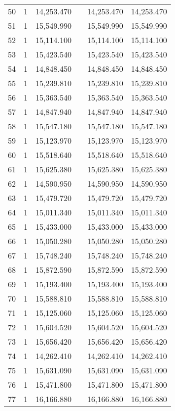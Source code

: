 \begin{table}[!htbp]
\begin{tabular}{@{\extracolsep{5pt}}lccccc}
50 & 1 & 14,253.470 &  & 14,253.470 & 14,253.470 \\ 
51 & 1 & 15,549.990 &  & 15,549.990 & 15,549.990 \\ 
52 & 1 & 15,114.100 &  & 15,114.100 & 15,114.100 \\ 
53 & 1 & 15,423.540 &  & 15,423.540 & 15,423.540 \\ 
54 & 1 & 14,848.450 &  & 14,848.450 & 14,848.450 \\ 
55 & 1 & 15,239.810 &  & 15,239.810 & 15,239.810 \\ 
56 & 1 & 15,363.540 &  & 15,363.540 & 15,363.540 \\ 
57 & 1 & 14,847.940 &  & 14,847.940 & 14,847.940 \\ 
58 & 1 & 15,547.180 &  & 15,547.180 & 15,547.180 \\ 
59 & 1 & 15,123.970 &  & 15,123.970 & 15,123.970 \\ 
60 & 1 & 15,518.640 &  & 15,518.640 & 15,518.640 \\ 
61 & 1 & 15,625.380 &  & 15,625.380 & 15,625.380 \\ 
62 & 1 & 14,590.950 &  & 14,590.950 & 14,590.950 \\ 
63 & 1 & 15,479.720 &  & 15,479.720 & 15,479.720 \\ 
64 & 1 & 15,011.340 &  & 15,011.340 & 15,011.340 \\ 
65 & 1 & 15,433.000 &  & 15,433.000 & 15,433.000 \\ 
66 & 1 & 15,050.280 &  & 15,050.280 & 15,050.280 \\ 
67 & 1 & 15,748.240 &  & 15,748.240 & 15,748.240 \\ 
68 & 1 & 15,872.590 &  & 15,872.590 & 15,872.590 \\ 
69 & 1 & 15,193.400 &  & 15,193.400 & 15,193.400 \\ 
70 & 1 & 15,588.810 &  & 15,588.810 & 15,588.810 \\ 
71 & 1 & 15,125.060 &  & 15,125.060 & 15,125.060 \\ 
72 & 1 & 15,604.520 &  & 15,604.520 & 15,604.520 \\ 
73 & 1 & 15,656.420 &  & 15,656.420 & 15,656.420 \\ 
74 & 1 & 14,262.410 &  & 14,262.410 & 14,262.410 \\ 
75 & 1 & 15,631.090 &  & 15,631.090 & 15,631.090 \\ 
76 & 1 & 15,471.800 &  & 15,471.800 & 15,471.800 \\ 
77 & 1 & 16,166.880 &  & 16,166.880 & 16,166.880 \\ 

\end{tabular}
\end{table}
